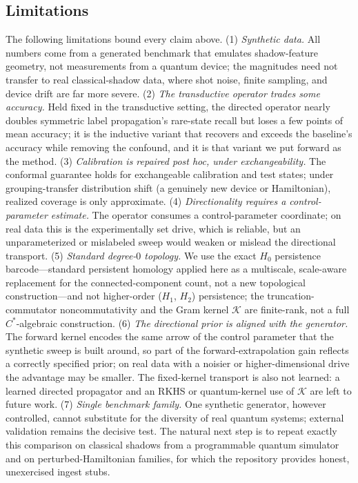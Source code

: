 \documentclass[aps,prresearch,reprint,amsmath,amssymb,nofootinbib,superscriptaddress,floatfix]{revtex4-2}
\theoremstyle{definition}
\theoremstyle{remark}
\theoremstyle{plain}
\begin{document}
\subsection{Limitations}
\label{sec:limitations}
The following limitations bound every claim above.
(1) \emph{Synthetic data.} All numbers come from a generated benchmark that emulates shadow-feature
geometry, not measurements from a quantum device; the magnitudes need not transfer to real classical-shadow
data, where shot noise, finite sampling, and device drift are far more severe.
(2) \emph{The transductive operator trades some accuracy.} Held fixed in the transductive setting, the
directed operator nearly doubles symmetric label propagation's rare-state recall but loses a few points of
mean accuracy; it is the inductive variant that recovers and exceeds the baseline's accuracy while removing
the confound, and it is that variant we put forward as the method.
(3) \emph{Calibration is repaired post hoc, under exchangeability.} The conformal guarantee holds for
exchangeable calibration and test states; under grouping-transfer distribution shift (a genuinely new
device or Hamiltonian), realized coverage is only approximate.
(4) \emph{Directionality requires a control-parameter estimate.} The operator consumes a control-parameter
coordinate; on real data this is the experimentally set drive, which is reliable, but an unparameterized or
mislabeled sweep would weaken or mislead the directional transport.
(5) \emph{Standard degree-$0$ topology.} We use the exact $H_0$ persistence barcode---standard persistent
homology \cite{edelsbrunner2010computational,carlsson2009topology} applied here as a multiscale,
scale-aware replacement for the connected-component count, not a new topological construction---and not
higher-order ($H_1$, $H_2$) persistence; the truncation-commutator noncommutativity and the Gram kernel
$\mathcal K$ are finite-rank, not a full $C^*$-algebraic construction.
(6) \emph{The directional prior is aligned with the generator.} The forward kernel encodes the same arrow
of the control parameter that the synthetic sweep is built around, so part of the forward-extrapolation
gain reflects a correctly specified prior; on real data with a noisier or higher-dimensional drive the
advantage may be smaller. The fixed-kernel transport is also not learned: a learned directed propagator and
an RKHS or quantum-kernel use of $\mathcal K$ are left to future work.
(7) \emph{Single benchmark family.} One synthetic generator, however controlled, cannot substitute for the
diversity of real quantum systems; external validation remains the decisive test. The natural next step is
to repeat exactly this comparison on classical shadows from a programmable quantum simulator and on
perturbed-Hamiltonian families, for which the repository provides honest, unexercised ingest stubs.
\end{document}
